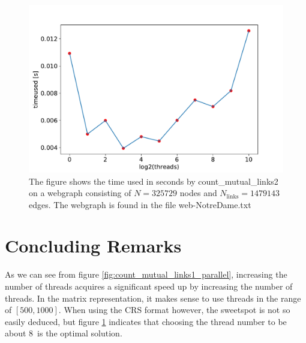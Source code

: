 \documentclass[english,notitlepage, reprint]{revtex4-1}  %
\begin{document}
\begin{figure}[H]
    \centering
    \includegraphics[scale = 0.4]{count_mutual_links2_parallel.pdf}
    \caption{The figure shows the time used  in seconds by count\_mutual\_links2 on a webgraph consisting of $N = 325729$ nodes and $N_\text{links} = 1479143$ edges. The webgraph is found in the file web-NotreDame.txt}\label{fig:count_mutual_links2_parallel}
\end{figure}

\section{Concluding Remarks}
As we can see from figure \ref{fig:count_mutual_links1_parallel}, increasing the number of threads acquires a significant speed up by increasing the number of threads. In the matrix representation, it makes sense to use threads in the range of $[500, 1000]$. When using the CRS format however, the sweetspot is not so easily deduced, but figure \ref{fig:count_mutual_links2_parallel} indicates that choosing the thread number to be about $8$ is the optimal solution.
\end{document}
